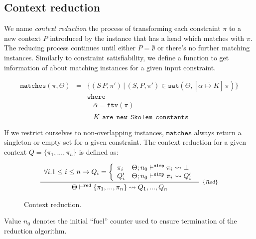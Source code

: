 \documentclass[a4paper, 11pt]{article}
\theoremstyle{definition}
\begin{document}
\subsection{Context reduction} 

We name \emph{context reduction} the process of transforming 
each constraint $\pi$ to a new context $P$ introduced 
by the instance that has a head which matches with 
$\pi$. The reducing process continues until either $P = \emptyset$ 
or there's no further matching instances. Similarly to 
constraint satisfiability, we define a function to 
get information of about matching instances for a given 
input constraint.

\[
  \begin{array}{lcl}
    \mathtt{matches}(\pi,\Theta) & = &\{(S\,P,\pi')\,|\,(S,P,\pi') \in \mathtt{sat}(\Theta,[\overline{\alpha\mapsto K}]\,\pi)\}\\
                          &   &\mathtt{where} \\ 
                          &   &\:\:\:\:\overline{\alpha} = \mathtt{ftv}(\pi)\\
                          &   &\:\:\:\:\overline{K}\:\:\mathtt{are}\:\:\mathtt{new}\:\:\mathtt{Skolem}\:\:\mathtt{constants}
  \end{array}
\]

If we restrict ourselves to non-overlapping instances, 
$\mathtt{matches}$ always return a singleton or empty set for 
a given constraint. The context reduction for a given context
$Q = \{\pi_1,...,\pi_n\}$ is defined as: 

\begin{figure}[H] 
  \[
    \begin{array}{c}
      \infer[_{\{Red\}}]
            {\Theta \reduce \{\pi_1,...,\pi_n\} \leadsto Q_1,..., Q_n}
            {\begin{array}{l}
              \forall i. 1 \leq i \leq n \to Q_i = \left\{
                    \begin{array}{ll}
                      \pi_i & \Theta ; n_0\simp \pi_i \leadsto \bot \\
                      Q'_i & \Theta ; n_0 \simp \pi_i \leadsto Q'_i  
                    \end{array} 
                    \right. 
             \end{array}}
    \end{array}
  \]
  \centering 
  \caption{Context reduction.}
  \label{fig:context-reduction}
\end{figure}
Value $n_0$ denotes the initial ``fuel'' counter used to 
ensure termination of the reduction algorithm.
\end{document}
